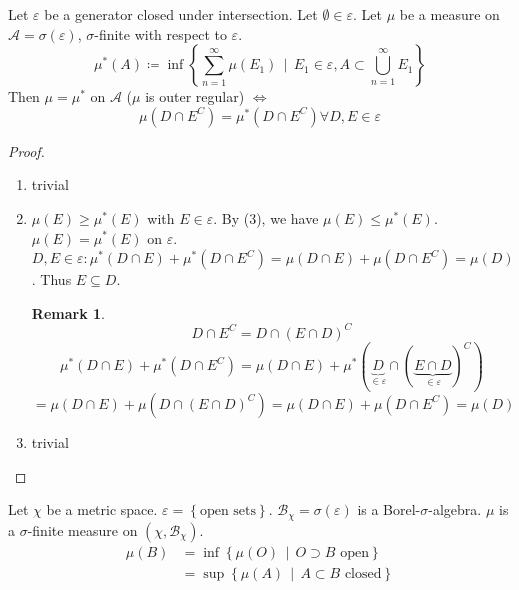 \documentclass[a4paper]{article}
\numberwithin{lecref}{section}
\theoremstyle{break}
\newtheorem*{Remark}{Remark}
\newcommand{\Set}[1]{\left\{#1\right\}}
\newcommand{\SetDef}[2]{\left\{#1\,\mid\,#2\right\}}
\begin{document}
\begin{theorem}
  Let $\varepsilon$ be a generator closed under intersection. Let $\emptyset \in \varepsilon$.
  Let $\mu$ be a measure on $\mathcal A = \sigma(\varepsilon)$, $\sigma$-finite with respect to $\varepsilon$.
  \[ \mu^*(A) \coloneqq \inf\SetDef{\sum_{n=1}^\infty \mu(E_1)}{E_1 \in \varepsilon, A \subset \bigcup_{n=1}^\infty E_1} \]
  Then $\mu = \mu^*$ on $\mathcal A$ ($\mu$ is outer regular) $\iff$
  \[ \mu(D \cap E^C) = \mu^*(D \cap E^C) \forall D, E \in \varepsilon \]
\end{theorem}

\begin{proof}
  \begin{enumerate}
    \item trivial
    \item
      $\mu(E) \geq \mu^*(E)$ with $E \in \varepsilon$.
      By (3), we have $\mu(E) \leq \mu^*(E)$.
      $\mu(E) = \mu^*(E)$ on $\varepsilon$.
      $D, E \in \varepsilon: \mu^*(D \cap E) + \mu^*(D \cap E^C) = \mu(D \cap E) + \mu(D \cap E^C) = \mu(D)$.
      Thus $E \subseteq D$.

      \begin{Remark}
        \[ D \cap E^C = D \cap (E \cap D)^C \]
        \[ \mu^*(D \cap E) + \mu^*(D \cap E^C) = \mu(D \cap E) + \mu^*(\underbrace{D}_{\in \varepsilon} \cap (\underbrace{E \cap D}_{\in \varepsilon})^C) \]
        \[ = \mu(D \cap E) + \mu(D \cap (E \cap D)^C) = \mu(D \cap E) + \mu(D \cap E^C) = \mu(D) \]
      \end{Remark}
    \item trivial
  \end{enumerate}
\end{proof}

\begin{theorem}
  Let $\chi$ be a metric space. $\varepsilon = \Set{\text{open sets}}$.
  $\mathcal B_{\chi} = \sigma(\varepsilon)$ is a Borel-$\sigma$-algebra.
  $\mu$ is a $\sigma$-finite measure on $(\chi, \mathcal B_{\chi})$.
  \begin{align*}
    \mu(B) &= \inf\SetDef{\mu(O)}{O \supset B \text{ open}} \\
           &= \sup\SetDef{\mu(A)}{A \subset B \text{ closed}}
  \end{align*}
\end{theorem}
\end{document}
